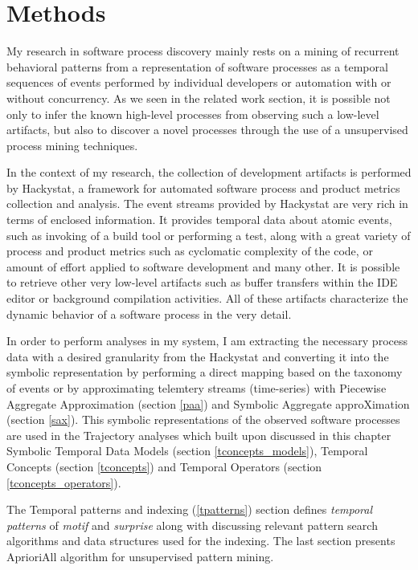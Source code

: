 \chapter{Methods} \label{methods}
My research in software process discovery mainly rests on a mining of recurrent behavioral patterns from a representation of software processes as a temporal sequences of events performed by individual developers or automation with or without concurrency. As we seen in the related work section, it is possible not only to infer the known high-level processes from observing such a low-level artifacts, but also to discover a novel processes through the use of a unsupervised process mining techniques.

In the context of my research, the collection of development artifacts is performed by Hackystat, a framework for automated software process and product metrics collection and analysis. The event streams provided by Hackystat are very rich in terms of enclosed information. It provides temporal data about atomic events, such as invoking of a build tool or performing a test, along with a great variety of process and product metrics such as cyclomatic complexity of the code, or amount of effort applied to software development and many other. It is possible to retrieve other very low-level artifacts such as buffer transfers within the IDE editor or background compilation activities. All of these artifacts characterize the dynamic behavior of a software process in the very detail.

In order to perform analyses in my system, I am extracting the necessary process data with a desired granularity from the Hackystat and converting it into the symbolic representation by performing a direct mapping based on the taxonomy of events or by approximating telemtery streams (time-series) with Piecewise Aggregate Approximation (section \ref{paa}) and Symbolic Aggregate approXimation (section \ref{sax}). This symbolic representations of the observed software processes are used in the Trajectory analyses which built upon discussed in this chapter Symbolic Temporal Data Models (section \ref{tconcepts_models}), Temporal Concepts (section \ref{tconcepts}) and Temporal Operators (section \ref{tconcepts_operators}). 

The Temporal patterns and indexing (\ref{tpatterns}) section defines \textit{temporal patterns} of \textit{motif} and \textit{surprise} along with discussing relevant pattern search algorithms and data structures used for the indexing. The last section presents AprioriAll algorithm for unsupervised pattern mining.